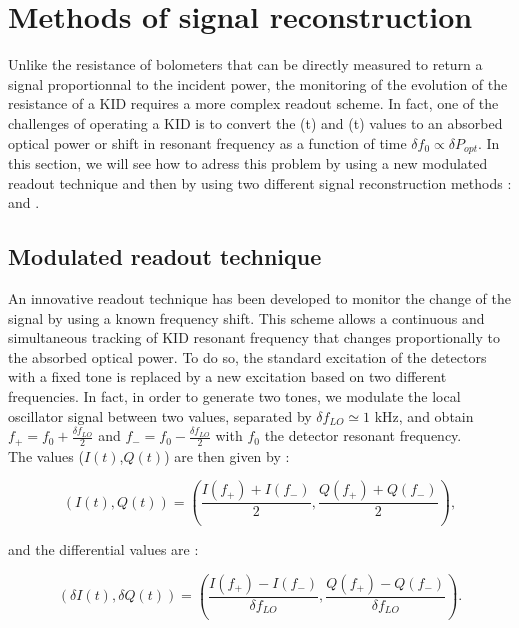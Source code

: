 \section{Methods of signal reconstruction}
\label{sec:signal}


Unlike the resistance of bolometers that can be directly measured to return a signal proportionnal to the incident power, the monitoring of the evolution of the resistance of a KID requires a more complex readout scheme. In fact, one of the challenges of operating a KID is to convert the \I(t) and \Q(t) values to an absorbed optical power or shift in resonant frequency as a function of time $\delta f_{0} \propto \delta P_{opt}$. In this
section, we will see how to adress this problem by using a new modulated readout technique and then by using two different signal reconstruction methods : \rf and \cf.

\subsection{Modulated readout technique}
An innovative readout technique has been developed to monitor the change of the signal by using a known frequency shift. This scheme allows a continuous and simultaneous tracking of KID resonant frequency that changes proportionally to the absorbed optical power. To do so, the standard excitation of the detectors with a fixed tone is replaced by a new excitation based on two different frequencies. In fact, in order to generate two tones, we modulate the local oscillator signal between two values, separated by $\delta f_{LO} \simeq 1$ kHz, and obtain $f_{+} = f_{0} + \frac{\delta f_{LO}}{2}$ and $f_{-} = f_{0} - \frac{\delta f_{LO}}{2}$ with $f_{0}$ the detector resonant frequency.\\
The values ($I(t)$,$Q(t)$) are then given by :

\begin{equation}
(I(t),Q(t)) = (\frac{I(f_{+}) + I(f_{-})}{2}, \frac{Q(f_{+}) + Q(f_{-})}{2}),
\end{equation}

and the differential values are :

\begin{equation}
\label{gradient}
(\delta I(t), \delta Q(t)) = (\frac{I(f_{+}) - I(f_{-})}{\delta f_{LO}}, \frac{Q(f_{+}) - Q(f_{-})}{\delta f_{LO}}).
\end{equation}

